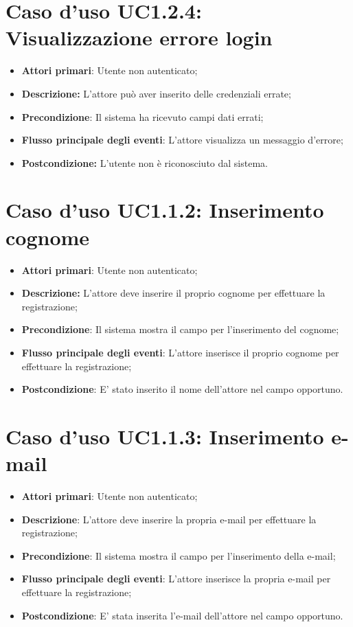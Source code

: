	\section{Caso d'uso UC1.2.4: Visualizzazione errore login}
		\begin{itemize}
			\item \textbf{Attori primari}: Utente non autenticato;
			\item \textbf{Descrizione:} L'attore può aver inserito delle credenziali errate;
			\item \textbf{Precondizione}: Il sistema ha ricevuto campi dati errati;
			\item \textbf{Flusso principale degli eventi}: L'attore visualizza un messaggio d'errore;
			\item \textbf{Postcondizione:} L'utente non è riconosciuto dal sistema.
		\end{itemize}
		\section{Caso d'uso UC1.1.2: Inserimento cognome}
		\begin{itemize}
			\item \textbf{Attori primari}: Utente non autenticato;
			\item \textbf{Descrizione:} L'attore deve inserire il proprio cognome per effettuare la registrazione;
			\item \textbf{Precondizione}: Il sistema mostra il campo per l'inserimento del cognome;
			\item \textbf{Flusso principale degli eventi}: L'attore inserisce il proprio cognome per effettuare la registrazione;
			\item \textbf{Postcondizione}: E' stato inserito il nome dell'attore nel campo opportuno.
		\end{itemize}
		\section{Caso d'uso UC1.1.3: Inserimento e-mail}
		\begin{itemize}
			\item \textbf{Attori primari}: Utente non autenticato;
			\item \textbf{Descrizione}: L'attore deve inserire la propria e-mail per effettuare la  registrazione;
			\item \textbf{Precondizione}: Il sistema mostra il campo per l'inserimento della e-mail;
			\item \textbf{Flusso principale degli eventi}: L'attore inserisce la propria e-mail per effettuare la registrazione;
			\item \textbf{Postcondizione}: E' stata inserita l'e-mail dell'attore nel campo opportuno.
		\end{itemize}
